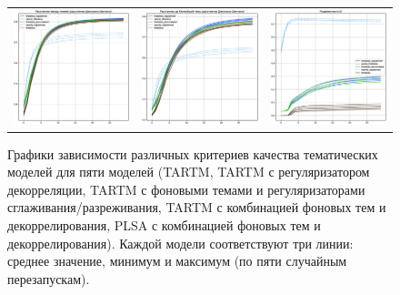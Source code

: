 \begin{figure}
\begin{tabular}{ccc}
    \includegraphics[width=55mm]{images/CH4_improved_diversity_jensenshannon_False.eps} &   \includegraphics[width=55mm]{images/CH4_improved_diversity_jensenshannon_True.eps} & \includegraphics[width=55mm]{images/CH4_improved_SparsityThetaScore.eps} \\ 

\end{tabular} 
    \caption{Графики зависимости различных критериев качества тематических моделей для пяти моделей (TARTM, TARTM с регуляризатором декорреляции, TARTM с фоновыми темами и регуляризаторами сглаживания/разреживания, TARTM с комбинацией фоновых тем и декоррелирования, PLSA с комбинацией фоновых тем и декоррелирования). Каждой модели соответствуют три линии: среднее значение, минимум и максимум (по пяти случайным перезапускам).} 
\label{fig:ch4_improved} 
\end{figure} 

